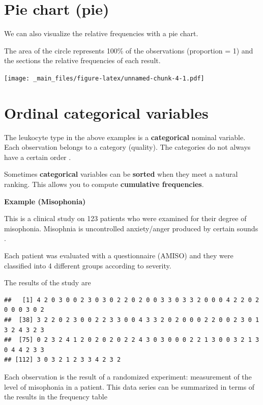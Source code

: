 \documentclass[
]{book}
\begin{document}
\hypertarget{pie-chart-pie}{%
\section{Pie chart (pie)}\label{pie-chart-pie}}

We can also visualize the relative frequencies with a pie chart.

The area of the circle represents 100\% of the observations (proportion = 1) and the sections the relative frequencies of each result.

\texttt{[image: \_main\_files/figure-latex/unnamed-chunk-4-1.pdf]}

\hypertarget{ordinal-categorical-variables}{%
\section{Ordinal categorical variables}\label{ordinal-categorical-variables}}

The leukocyte type in the above examples is a \textbf{categorical} nominal variable. Each observation belongs to a category (quality). The categories do not always have a certain order .

Sometimes \textbf{categorical} variables can be \textbf{sorted} when they meet a natural ranking. This allows you to compute \textbf{cumulative frequencies}.

\textbf{Example (Misophonia)}

This is a clinical study on 123 patients who were examined for their degree of misophonia. Misophnia is uncontrolled anxiety/anger produced by certain sounds .

Each patient was evaluated with a questionnaire (AMISO) and they were classified into 4 different groups according to severity.

The results of the study are

\begin{verbatim}
##   [1] 4 2 0 3 0 0 2 3 0 3 0 2 2 0 2 0 0 3 3 0 3 3 2 0 0 0 4 2 2 0 2 0 0 0 3 0 2
##  [38] 3 2 2 0 2 3 0 0 2 2 3 3 0 0 4 3 3 2 0 2 0 0 0 2 2 0 0 2 3 0 1 3 2 4 3 2 3
##  [75] 0 2 3 2 4 1 2 0 2 0 2 0 2 2 4 3 0 3 0 0 0 2 2 1 3 0 0 3 2 1 3 0 4 4 2 3 3
## [112] 3 0 3 2 1 2 3 3 4 2 3 2
\end{verbatim}

Each observation is the result of a randomized experiment: measurement of the level of misophonia in a patient. This data series can be summarized in terms of the results in the frequency table
\end{document}
